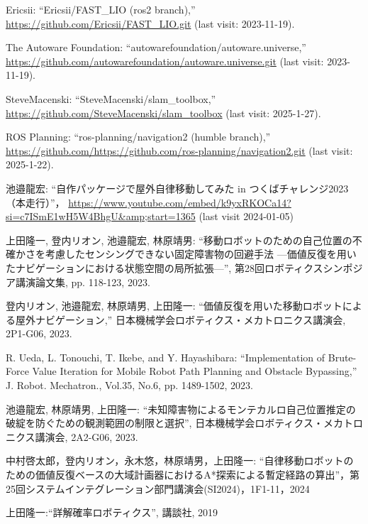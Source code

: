 \documentclass[twocolumn,9pt]{jsproceedings}
\begin{document}
\begin{thebibliography}{99}
  Ericsii: ``Ericsii/FAST\_LIO (ros2 branch),'' \url{https://github.com/Ericsii/FAST_LIO.git} (last visit: 2023-11-19).

  The Autoware Foundation: ``autowarefoundation/autoware.universe,'' \url{https://github.com/autowarefoundation/autoware.universe.git} (last visit: 2023-11-19).

  SteveMacenski: ``SteveMacenski/slam\_toolbox,'' \url{https://github.com/SteveMacenski/slam_toolbox} (last visit: 2025-1-27).

  ROS Planning: ``ros-planning/navigation2 (humble branch),'' \url{https://github.com/https://github.com/ros-planning/navigation2.git} (last visit: 2025-1-22).


  池邉龍宏: ``自作パッケージで屋外自律移動してみた in つくばチャレンジ2023（本走行）''，
  \url{https://www.youtube.com/embed/k9yxRKOCa14?si=c7ISmE1wH5W4BhgU&amp;start=1365} (last visit 2024-01-05)

上田隆一, 登内リオン, 池邉龍宏, 林原靖男: ``移動ロボットのための自己位置の不確かさを考慮したセンシングできない固定障害物の回避手法 ---価値反復を用いたナビゲーションにおける状態空間の局所拡張---'', 第28回ロボティクスシンポジア講演論文集, pp. 118-123, 2023.

  登内リオン, 池邉龍宏, 林原靖男, 上田隆一: ``価値反復を用いた移動ロボットによる屋外ナビゲーション,''
  日本機械学会ロボティクス・メカトロニクス講演会, 2P1-G06, 2023.

  R. Ueda, L. Tonouchi, T. Ikebe, and Y. Hayashibara: ``Implementation of Brute-Force Value Iteration for Mobile Robot Path Planning and Obstacle Bypassing,''
  J. Robot. Mechatron., Vol.35, No.6, pp. 1489-1502, 2023.

  池邉龍宏, 林原靖男, 上田隆一: ``未知障害物によるモンテカルロ自己位置推定の破綻を防ぐための観測範囲の制限と選択'',
  日本機械学会ロボティクス・メカトロニクス講演会, 2A2-G06, 2023.

    中村啓太郎，登内リオン，永木悠，林原靖男，上田隆一: ``自律移動ロボットのための価値反復ベースの大域計画器におけるA*探索による暫定経路の算出''，第25回システムインテグレーション部門講演会(SI2024)，1F1-11，2024

    上田隆一:``詳解確率ロボティクス'', 講談社, 2019
\end{thebibliography}
\normalsize
\end{document}
